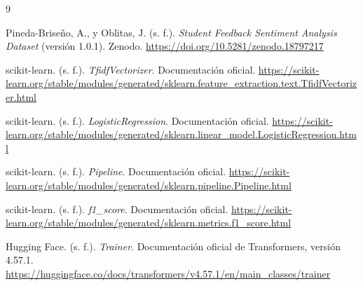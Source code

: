 \documentclass[11pt,a4paper]{article}
\begin{document}
\newpage
\begin{thebibliography}{9}
 Pineda-Briseño, A., y Oblitas, J. (s. f.).
\textit{Student Feedback Sentiment Analysis Dataset} (versión 1.0.1).
Zenodo. \url{https://doi.org/10.5281/zenodo.18797217}

 scikit-learn. (s. f.). \textit{TfidfVectorizer}.
Documentación oficial.
\url{https://scikit-learn.org/stable/modules/generated/sklearn.feature_extraction.text.TfidfVectorizer.html}

 scikit-learn. (s. f.). \textit{LogisticRegression}.
Documentación oficial.
\url{https://scikit-learn.org/stable/modules/generated/sklearn.linear_model.LogisticRegression.html}

 scikit-learn. (s. f.). \textit{Pipeline}.
Documentación oficial.
\url{https://scikit-learn.org/stable/modules/generated/sklearn.pipeline.Pipeline.html}

 scikit-learn. (s. f.). \textit{f1\_score}.
Documentación oficial.
\url{https://scikit-learn.org/stable/modules/generated/sklearn.metrics.f1_score.html}

 Hugging Face. (s. f.). \textit{Trainer}.
Documentación oficial de Transformers, versión 4.57.1.
\url{https://huggingface.co/docs/transformers/v4.57.1/en/main_classes/trainer}
\end{thebibliography}
\end{document}
